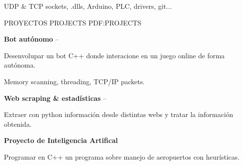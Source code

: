 \documentclass[letterpaper,MMMyyyy,nonstopmode]{simpleresumecv}
\newcommand\tab[1][0.5cm]{\hspace*{#1}}
\begin{document}
\begin{Body}

\tab UDP \& TCP sockets, .dlls, Arduino, PLC, drivers, git... 



\Gap



\Gap







\Gap

\hfill



\Section
{PROYECTOS}
{PROJECTS}
{PDF:PROJECTS}

\Entry



{\textbf{Bot autónomo}}
\hfill
{} --

\tab Desenvolupar un bot C++ donde interacione en un juego online de forma autónoma. 

\tab Memory scanning, threading, TCP/IP packets. 

\Gap


{\textbf{Web scraping \& estadísticas}}
\hfill
{} --

\tab  Extraer con python información desde distintas webs y tratar la información obtenida.

\Gap

{\textbf{Proyecto de Inteligencia Artifical}}
\hfill
{}

\tab  Programar en C++ un programa sobre manejo de aeropuertos con heurísticas.



\end{Body}
\end{document}
